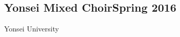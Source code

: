 \documentclass[a4paper, 12pt]{article}
\begin{document}
\subsection*{{Yonsei Mixed Choir}\hfill Spring 2016}
Yonsei University
\end{document}
